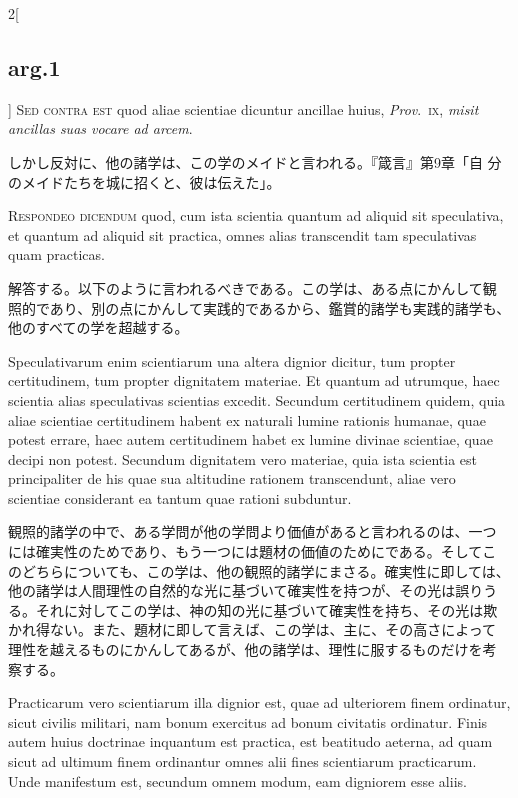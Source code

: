 \documentclass[
paper=a4paper,
fontsize=10pt,
jafontsize=9pt,
titlepage
]{jlreq}
\begin{document}
\begin{paracol}{2}[\subsection{arg.1}]
{\scshape Sed contra est} quod aliae scientiae dicuntur ancillae
huius, {\itshape Prov}.~{\scshape ix}, {\itshape misit ancillas suas
vocare ad arcem}.

\switchcolumn

しかし反対に、他の諸学は、この学のメイドと言われる。『箴言』第9章「自
分のメイドたちを城に招くと、彼は伝えた」。


{\scshape Respondeo dicendum} quod, cum ista scientia
quantum ad aliquid sit speculativa, et quantum ad aliquid sit practica,
omnes alias transcendit tam speculativas quam practicas.

\switchcolumn

解答する。以下のように言われるべきである。この学は、ある点にかんして観
照的であり、別の点にかんして実践的であるから、鑑賞的諸学も実践的諸学も、
他のすべての学を超越する。

\switchcolumn*

Speculativarum enim scientiarum una altera dignior dicitur, tum
propter certitudinem, tum propter dignitatem materiae.  Et quantum ad
utrumque, haec scientia alias speculativas scientias excedit. Secundum
certitudinem quidem, quia aliae scientiae certitudinem habent ex
naturali lumine rationis humanae, quae potest errare, haec autem
certitudinem habet ex lumine divinae scientiae, quae decipi non
potest. Secundum dignitatem vero materiae, quia ista scientia est
principaliter de his quae sua altitudine rationem transcendunt, aliae
vero scientiae considerant ea tantum quae rationi subduntur.

\switchcolumn

観照的諸学の中で、ある学問が他の学問より価値があると言われるのは、一つ
には確実性のためであり、もう一つには題材の価値のためにである。そしてこ
のどちらについても、この学は、他の観照的諸学にまさる。確実性に即しては、
他の諸学は人間理性の自然的な光に基づいて確実性を持つが、その光は誤りう
る。それに対してこの学は、神の知の光に基づいて確実性を持ち、その光は欺
かれ得ない。また、題材に即して言えば、この学は、主に、その高さによって
理性を越えるものにかんしてあるが、他の諸学は、理性に服するものだけを考
察する。

\switchcolumn*

Practicarum vero scientiarum illa dignior est, quae ad ulteriorem
finem ordinatur, sicut civilis militari, nam bonum exercitus ad bonum
civitatis ordinatur. Finis autem huius doctrinae inquantum est
practica, est beatitudo aeterna, ad quam sicut ad ultimum finem
ordinantur omnes alii fines scientiarum practicarum. Unde manifestum
est, secundum omnem modum, eam digniorem esse aliis.


\end{paracol}
\end{document}
